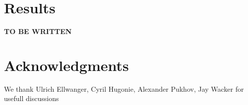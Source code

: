 \documentclass[aps,prl,nofootinbib,superscriptaddress]{revtex4}
\begin{document}
\section{Results}

{\bf TO BE WRITTEN}

 




%
\section*{Acknowledgments}
We thank 
Ulrich Ellwanger, Cyril Hugonie,
Alexander Pukhov, Jay Wacker
for usefull discussions


%
%

\def\Journal#1#2#3#4{{#1} {\bf #2}, #3 (#4)}
\def\NCA{Nuovo Cimento}
\def\NIM{Nucl. Instrum. Methods}
\def\NIMA{{Nucl. Instrum. Methods} A}
\def\NP{Nucl. Phys.} 
\def\NPB{{Nucl. Phys.} B}
\def\PLB{{Phys. Lett.}  B}
\def\PRL{Phys. Rev. Lett.}
\def\RPP{Rep. Prog. Phys.}
\def\PRD{{Phys. Rev.} D}
\def\PR{Phys. Rep.}
\def\PRP{Prog. Theor. Phys.}
\def\ZPC{{Z. Phys.} C}
\def\MPL{{Mod. Phys. Lett.} A}
\def\EPJC{{Eur. Phys. J.} C}
\def\CPC{Comput. Phys. Commun.}

\renewcommand{\baselinestretch}{1}
\end{document}
